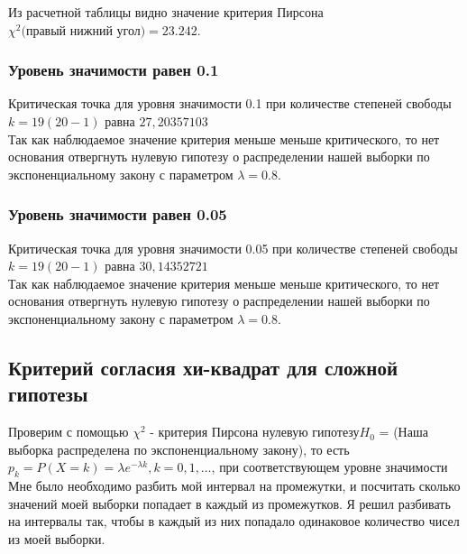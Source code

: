 \documentclass[a4paper,12pt, oneside]{book}
\begin{document}
\begin{figure}[h!]
\begin{center}
\begin{minipage}[h]{0.47\linewidth}
		\end{minipage}
	\end{center}
\end{figure}


\newpage
Из расчетной таблицы видно значение критерия Пирсона $ \chi^2 \text{(правый нижний угол)} = 23.242$. 

\subsubsection{Уровень значимости равен 0.1}

Критическая точка для уровня значимости 0.1 при количестве степеней свободы $ k = 19 (20 - 1)$ равна $27,20357103$\\

Так как наблюдаемое значение критерия меньше меньше критического, то нет основания отвергнуть нулевую гипотезу о распределении нашей выборки по экспоненциальному закону  с параметром $ \lambda = 0.8 $.  



\subsubsection{Уровень значимости равен 0.05} 

Критическая точка для уровня значимости 0.05 при количестве степеней свободы $ k = 19 ( 20 - 1) $ равна $30,14352721$\\

Так как наблюдаемое значение критерия меньше меньше критического, то нет основания отвергнуть нулевую гипотезу о распределении нашей выборки по экспоненциальному закону с параметром $ \lambda = 0.8 $.  

\subsection{Критерий согласия хи-квадрат для сложной гипотезы}


Проверим с помощью $ \chi^2 $  - критерия Пирсона нулевую гипотезу$ H_0 $ = (Наша выборка распределена по экспоненциальному закону), то есть $ p_k = P(X = k ) = \lambda e^{-\lambda k}, k = 0,1, \ldots $, при соответствующем уровне значимости\\ 

Мне было необходимо разбить мой интервал на промежутки, и посчитать сколько значений моей выборки попадает в каждый из промежутков. Я решил разбивать на интервалы так, чтобы в каждый из них попадало одинаковое количество чисел из моей выборки.\\
\end{document}
